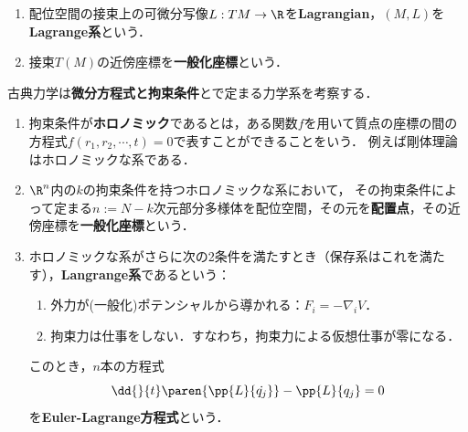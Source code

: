 \documentclass[uplatex,dvipdfmx]{jsreport}
\begin{document}
\begin{definition}\mbox{}
    \begin{enumerate}
        \item 配位空間の接束上の可微分写像$L:TM\to\R$を\textbf{Lagrangian}，$(M,L)$を\textbf{Lagrange系}という．
        \item 接束$T(M)$の近傍座標を\textbf{一般化座標}という．
    \end{enumerate}
\end{definition}
\begin{example}
    古典力学は\textbf{微分方程式と拘束条件}とで定まる力学系を考察する．
    \begin{enumerate}
        \item 拘束条件が\textbf{ホロノミック}であるとは，ある関数$f$を用いて質点の座標の間の方程式$f(r_1,r_2,\cdots,t)=0$で表すことができることをいう．
        例えば剛体理論はホロノミックな系である．
        \item $\R^n$内の$k$の拘束条件を持つホロノミックな系において，
        その拘束条件によって定まる$n:=N-k$次元部分多様体を配位空間，その元を\textbf{配置点}，その近傍座標を\textbf{一般化座標}という．
        \item ホロノミックな系がさらに次の2条件を満たすとき（保存系はこれを満たす），\textbf{Langrange系}であるという：
        \begin{enumerate}[({L}1)]
            \item 外力が(一般化)ポテンシャルから導かれる：$F_i=-\nabla_iV$．
            \item 拘束力は仕事をしない．すなわち，拘束力による仮想仕事が零になる．
        \end{enumerate}
        このとき，$n$本の方程式
        \[\dd{}{t}\paren{\pp{L}{\dot{q_j}}}-\pp{L}{q_j}=0\]
        を\textbf{Euler-Lagrange方程式}という．
    \end{enumerate}
\end{example}
\end{document}
